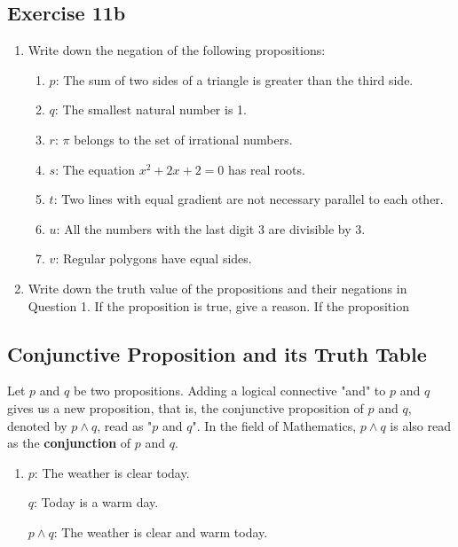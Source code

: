 \documentclass{report}
\newcounter{example}
\begin{document}
\subsection*{Exercise 11b}
\begin{enumerate}[leftmargin=*]
    \item Write down the negation of the following propositions:
          \begin{enumerate}[label=, leftmargin=*]
              \item $p$: The sum of two sides of a triangle is greater than the third side.
              \item $q$: The smallest natural number is 1.
              \item $r$: $\pi$ belongs to the set of irrational numbers.
              \item $s$: The equation $x^2 + 2x + 2 = 0$ has real roots.
              \item $t$: Two lines with equal gradient are not necessary parallel to each other.
              \item $u$: All the numbers with the last digit 3 are divisible by 3.
              \item $v$: Regular polygons have equal sides.
          \end{enumerate}
    \item Write down the truth value of the propositions and their negations in Question
          1. If the proposition is true, give a reason. If the proposition
\end{enumerate}

\subsection*{Conjunctive Proposition and its Truth Table}

Let $p$ and $q$ be two propositions. Adding a logical connective "and" to $p$
and $q$ gives us a new proposition, that is, the conjunctive proposition of $p$
and $q$, denoted by $p \land q$, read as "$p$ and $q$". In the field of
Mathematics, $p \land q$ is also read as the \textbf{conjunction} of $p$ and
$q$.

\begin{enumerate}[label=\indent For example, leftmargin=*]
    \item $p$: The weather is clear today.

          $q$: Today is a warm day.

          $p \land q$: The weather is clear and warm today.
\end{enumerate}
\end{document}
